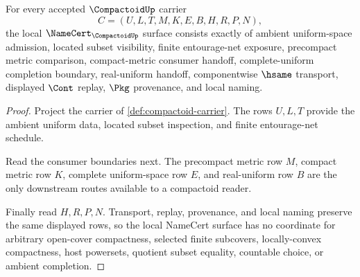 \begin{theorem}
\label{thm:compactoid-namecert-obligations}
For every accepted $\CompactoidUp$ carrier
$$
C=(U,L,T,M,K,E,B,H,R,P,N),
$$
the local $\NameCert_{\CompactoidUp}$ surface consists exactly of ambient uniform-space admission, located subset visibility, finite entourage-net exposure, precompact metric comparison, compact-metric consumer handoff, complete-uniform completion boundary, real-uniform handoff, componentwise $\hsame$ transport, displayed $\Cont$ replay, $\Pkg$ provenance, and local naming.
\end{theorem}
\begin{proof}
Project the carrier of \autoref{def:compactoid-carrier}. The rows $U,L,T$ provide the ambient uniform data, located subset inspection, and finite entourage-net schedule.

Read the consumer boundaries next. The precompact metric row $M$, compact metric row $K$, complete uniform-space row $E$, and real-uniform row $B$ are the only downstream routes available to a compactoid reader.

Finally read $H,R,P,N$. Transport, replay, provenance, and local naming preserve the same displayed rows, so the local NameCert surface has no coordinate for arbitrary open-cover compactness, selected finite subcovers, locally-convex compactness, host powersets, quotient subset equality, countable choice, or ambient completion.
\end{proof}

